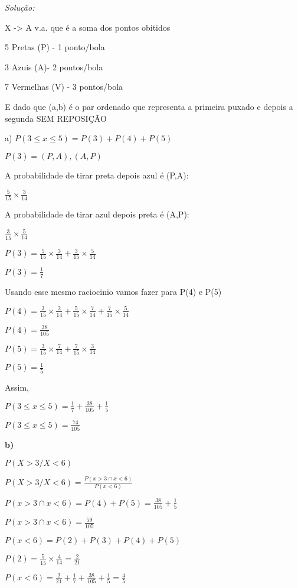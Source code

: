 \documentclass{article}
\newenvironment{solution}
    {\textit{Solução:}}
    {}
\begin{document}
\begin{solution}

X -> A v.a. que é a soma dos pontos obitidos

5 Pretas (P) - 1 ponto/bola

3 Azuis (A)- 2 pontos/bola

7 Vermelhas (V) - 3 pontos/bola

E dado que (a,b) é o par ordenado que representa a primeira puxado e depois a segunda SEM REPOSIÇÃO

a)  $P(3 \leq x \leq 5) = P(3) + P(4) + P(5)$

$P(3) = (P,A), (A,P)$

A probabilidade de tirar preta depois azul é (P,A):

$\frac{5}{15} \times \frac{3}{14}$

A probabilidade de tirar azul depois preta é (A,P):

$\frac{3}{15} \times \frac{5}{14}$

$P(3) = \frac{5}{15} \times \frac{3}{14} + \frac{3}{15} \times \frac{5}{14}$

$P(3) = \frac{1}{7}$

Usando esse mesmo raciocinio vamos fazer para P(4) e P(5)

$P(4) = \frac{3}{15} \times \frac{2}{14} + \frac{5}{15} \times \frac{7}{14} + \frac{7}{15} \times \frac{5}{14}$

$P(4) = \frac{38}{105}$

$P(5) = \frac{3}{15} \times \frac{7}{14} + \frac{7}{15} \times \frac{3}{14}$

$P(5) = \frac{1}{5}$

Assim,

$P(3 \leq x \leq 5) = \frac{1}{7} + \frac{38}{105} + \frac{1}{5}$

$P(3 \leq x \leq 5) = \frac{74}{105}$

\hrulefill

\textbf{b) }

$P(X>3/X<6)$ 

$P(X>3/X<6) = \frac{P(x > 3 \cap x < 6)}{P(x<6)}$ 

$P(x > 3 \cap x < 6) = P(4) + P(5) = \frac{38}{105} + \frac{1}{5}$

$P(x > 3 \cap x < 6) = \frac{59}{105}$


$P(x < 6) = P(2) + P(3) + P(4) + P(5)$

$P(2) = \frac{5}{15} \times \frac{4}{14} = \frac{2}{21}$

$P(x < 6) = \frac{2}{21} + \frac{1}{7} + \frac{38}{105} + \frac{1}{5} = \frac{4}{5}$


\end{solution}
\end{document}
